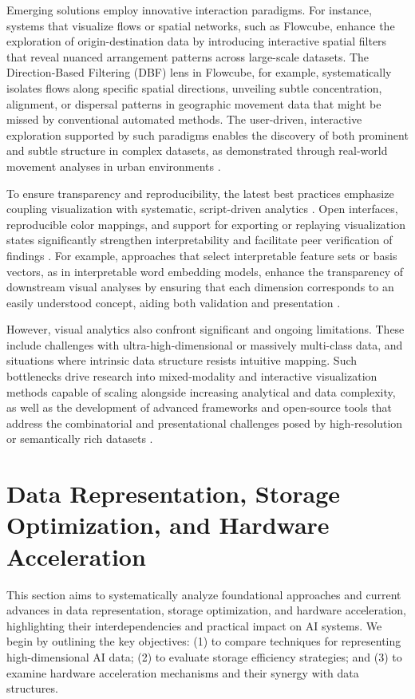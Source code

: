 \documentclass[sigconf]{acmart}
\begin{document}
Emerging solutions employ innovative interaction paradigms. For instance, systems that visualize flows or spatial networks, such as Flowcube, enhance the exploration of origin-destination data by introducing interactive spatial filters that reveal nuanced arrangement patterns across large-scale datasets. The Direction-Based Filtering (DBF) lens in Flowcube, for example, systematically isolates flows along specific spatial directions, unveiling subtle concentration, alignment, or dispersal patterns in geographic movement data that might be missed by conventional automated methods. The user-driven, interactive exploration supported by such paradigms enables the discovery of both prominent and subtle structure in complex datasets, as demonstrated through real-world movement analyses in urban environments \cite{ref53}.

To ensure transparency and reproducibility, the latest best practices emphasize coupling visualization with systematic, script-driven analytics \cite{ref94,ref99,ref115}. Open interfaces, reproducible color mappings, and support for exporting or replaying visualization states significantly strengthen interpretability and facilitate peer verification of findings \cite{ref86,ref115}. For example, approaches that select interpretable feature sets or basis vectors, as in interpretable word embedding models, enhance the transparency of downstream visual analyses by ensuring that each dimension corresponds to an easily understood concept, aiding both validation and presentation \cite{ref115}.

However, visual analytics also confront significant and ongoing limitations. These include challenges with ultra-high-dimensional or massively multi-class data, and situations where intrinsic data structure resists intuitive mapping. Such bottlenecks drive research into mixed-modality and interactive visualization methods capable of scaling alongside increasing analytical and data complexity, as well as the development of advanced frameworks and open-source tools that address the combinatorial and presentational challenges posed by high-resolution or semantically rich datasets \cite{ref86,ref99}.

\section{Data Representation, Storage Optimization, and Hardware Acceleration}
\label{sec:data-representation-optimization}

This section aims to systematically analyze foundational approaches and current advances in data representation, storage optimization, and hardware acceleration, highlighting their interdependencies and practical impact on AI systems. We begin by outlining the key objectives: (1) to compare techniques for representing high-dimensional AI data; (2) to evaluate storage efficiency strategies; and (3) to examine hardware acceleration mechanisms and their synergy with data structures.
\end{document}
